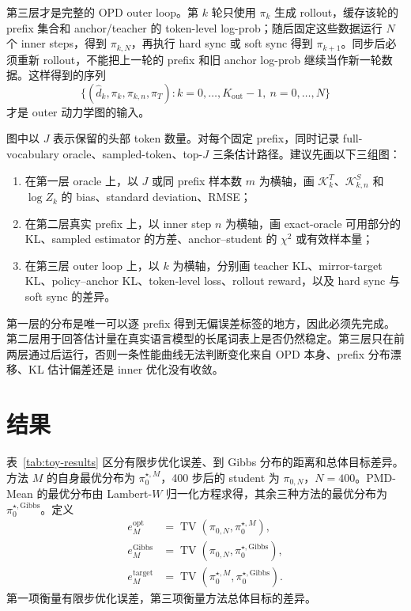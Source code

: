 第三层才是完整的 OPD outer loop。第 $k$ 轮只使用 $\pi_k$ 生成 rollout，缓存该轮的 prefix 集合和 anchor/teacher 的 token-level log-prob；随后固定这些数据运行 $N$ 个 inner steps，得到 $\pi_{k,N}$，再执行 hard sync 或 soft sync 得到 $\pi_{k+1}$。同步后必须重新 rollout，不能把上一轮的 prefix 和旧 anchor log-prob 继续当作新一轮数据。这样得到的序列
\[
\{(\widehat d_k,\pi_k,\pi_{k,n},\pi_T): k=0,\ldots,K_{\mathrm{out}}-1,\ n=0,\ldots,N\}
\]
才是 outer 动力学图的输入。

图中以 $J$ 表示保留的头部 token 数量。对每个固定 prefix，同时记录 full-vocabulary oracle、sampled-token、top-$J$ 三条估计路径。建议先画以下三组图：

\begin{enumerate}
\item 在第一层 oracle 上，以 $J$ 或同 prefix 样本数 $m$ 为横轴，画 $\mathcal K_k^T$、$\mathcal K_{k,n}^S$ 和 $\log Z_k$ 的 bias、standard deviation、RMSE；
\item 在第二层真实 prefix 上，以 inner step $n$ 为横轴，画 exact-oracle 可用部分的 KL、sampled estimator 的方差、anchor--student 的 $\chi^2$ 或有效样本量；
\item 在第三层 outer loop 上，以 $k$ 为横轴，分别画 teacher KL、mirror-target KL、policy--anchor KL、token-level loss、rollout reward，以及 hard sync 与 soft sync 的差异。
\end{enumerate}

第一层的分布是唯一可以逐 prefix 得到无偏误差标签的地方，因此必须先完成。第二层用于回答估计量在真实语言模型的长尾词表上是否仍然稳定。第三层只在前两层通过后运行，否则一条性能曲线无法判断变化来自 OPD 本身、prefix 分布漂移、KL 估计偏差还是 inner 优化没有收敛。

\section{结果}

表~\ref{tab:toy-results} 区分有限步优化误差、到 Gibbs 分布的距离和总体目标差异。方法 $M$ 的自身最优分布为 $\pi_0^{\star,M}$，400 步后的 student 为 $\pi_{0,N}$，$N=400$。PMD-Mean 的最优分布由 Lambert-$W$ 归一化方程求得，其余三种方法的最优分布为 $\pi_0^{\star,\mathrm{Gibbs}}$。定义
\begin{align*}
e^{\mathrm{opt}}_M&=\operatorname{TV}(\pi_{0,N},\pi_0^{\star,M}),\\
e^{\mathrm{Gibbs}}_M&=\operatorname{TV}(\pi_{0,N},\pi_0^{\star,\mathrm{Gibbs}}),\\
e^{\mathrm{target}}_M&=\operatorname{TV}(\pi_0^{\star,M},\pi_0^{\star,\mathrm{Gibbs}}).
\end{align*}
第一项衡量有限步优化误差，第三项衡量方法总体目标的差异。

